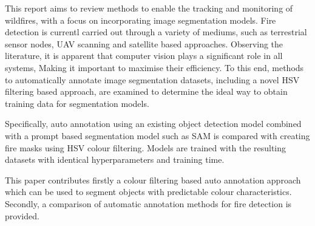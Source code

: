 \documentclass[lettersize,journal]{IEEEtran}
\begin{document}

This report aims to review methods to enable the tracking and monitoring of wildfires, with a focus on incorporating image segmentation models. Fire detection is currentl carried out through a variety of mediums, such as terrestrial sensor nodes, UAV scanning and satellite based approaches. Observing the literature, it is apparent that computer vision plays a significant role in all systems, Making it important to maximise their efficiency. To this end, methods to automatically annotate image segmentation datasets, including a novel HSV filtering based approach, are examined to determine the ideal way to obtain training data for segmentation models. 

Specifically, auto annotation using an existing object detection model combined with a prompt based segmentation model such as SAM is compared with creating fire masks using HSV colour filtering. Models are trained with the resulting datasets with identical hyperparameters and training time.

This paper contributes firstly a colour filtering based auto annotation approach which can be used to segment objects with predictable colour characteristics. Secondly, a comparison of automatic annotation methods for fire detection is provided.

\end{document}
